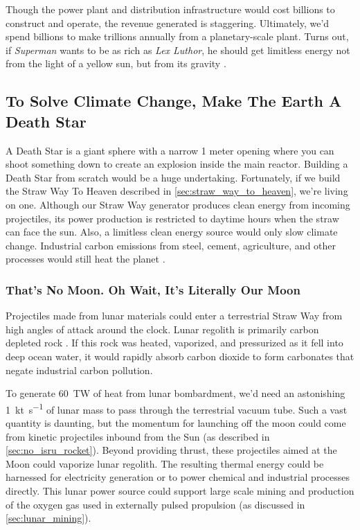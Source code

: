 \documentclass{article}
\begin{document}
Though the power plant and distribution infrastructure would cost billions to construct and operate, the revenue generated is staggering. Ultimately, we'd spend billions to make trillions annually from a planetary-scale plant.  Turns out, if  \textit{Superman} wants to be as rich as \textit{Lex Luthor}, he should get limitless energy not from the light of a yellow sun, but from its gravity \cite{superman2025}.

\subsection{To Solve Climate Change, Make The Earth A Death Star}\label{sec:death_star}
A Death Star \cite{death_star} is a giant sphere with a  narrow 1 meter opening where you can shoot something down to create an explosion inside the main reactor.   Building a Death Star from scratch  would be a huge undertaking.   Fortunately, if we build the Straw Way To Heaven described in \autoref{sec:straw_way_to_heaven}, we're living on one.  Although our Straw Way generator produces clean energy from incoming projectiles, its power production is restricted to daytime hours when the straw can face the sun.   Also, a limitless clean energy source would only slow climate change.   Industrial carbon emissions from steel, cement, agriculture, and other processes would still heat the planet \cite{steel_and_cement}.   

\subsubsection{That's No Moon.  Oh Wait, It's Literally Our Moon}\cite{starwars1977}
Projectiles made from lunar materials could enter a terrestrial Straw Way from high angles of attack around the clock.  Lunar regolith is primarily carbon depleted rock \cite{mckay1991lunar}.  If this rock was heated, vaporized, and pressurized as it fell into deep ocean water, it would rapidly absorb carbon dioxide to form carbonates that  negate industrial carbon pollution.

To generate \SI{60}{\tera\watt} of heat from lunar bombardment, we'd need an astonishing \SI{1}{\kilo\tonne\per\second} of lunar mass to pass through the terrestrial vacuum tube. Such a vast quantity is daunting, but the momentum for launching off the moon could come from kinetic projectiles inbound from the Sun (as described in \autoref{sec:no_isru_rocket}). Beyond providing thrust, these projectiles aimed at the Moon could vaporize lunar regolith. The resulting thermal energy could be harnessed for electricity generation or to power chemical and industrial processes directly. This lunar power source could support large scale mining and production of the oxygen gas used in externally pulsed propulsion  (as discussed in \autoref{sec:lunar_mining}).
\end{document}
